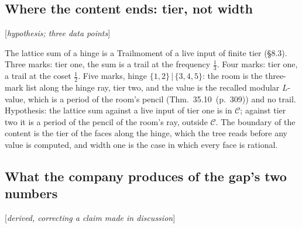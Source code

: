 \documentclass[11pt]{article}
\newcommand{\status}[1]{\hfill{\small[\textit{#1}]}}
\newcommand{\hb}[2]{#1~(p.~#2)}   %
\theoremstyle{plain}
\theoremstyle{remark}
\begin{document}
\subsection{Where the content ends: tier, not width}\status{hypothesis; three data points}

The lattice sum of a hinge is a Trailmoment of a live input of finite tier (\S8.3). Three marks: tier one, the sum is a trail at the frequency $\frac13$. Four marks: tier one, a trail at the coset $\frac12$. Five marks, hinge $\{1,2\}\,|\,\{3,4,5\}$: the room is the three-mark list along the hinge ray, tier two, and the value is the recalled modular $L$-value, which is a period of the room's pencil (Thm.~\hb{35.10}{309}) and no trail. Hypothesis: the lattice sum against a live input of tier one is in $\mathcal C$; against tier two it is a period of the pencil of the room's ray, outside $\mathcal C$. The boundary of the content is the tier of the faces along the hinge, which the tree reads before any value is computed, and width one is the case in which every face is rational.

\subsection{What the company produces of the gap's two numbers}\status{derived, correcting a claim made in discussion}
\end{document}
